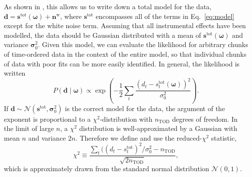 \documentclass[twocolumn]{../../common/aa}
\begin{document}
As shown in \citet{bp01}, this allows us to write down a total model for the data, $\boldsymbol d=\boldsymbol s^\mathrm{tot}(\boldsymbol\omega)+\boldsymbol n^\mathrm w$, where $\boldsymbol s^\mathrm{tot}$ encompasses all of the terms in Eq.~\eqref{eq:model} except for the white noise term. Assuming that all instrumental effects have been modelled, the data should be Gaussian distributed with a mean of $\boldsymbol s^\mathrm{tot}(\boldsymbol\omega)$ and variance $\boldsymbol \sigma_0^2$. Given this model, we can evaluate the likelihood for arbitrary chunks of time-ordered data in the context of the entire model, so that individual chunks of data with poor fits can be more easily identified. In general, the likelihood is written
\begin{equation}
	P(\boldsymbol d\mid\boldsymbol\omega)\propto\exp\left(-\frac12\sum_t\frac{(d_t-s^\mathrm{tot}_t(\boldsymbol\omega))^2}{\sigma_0^2}
	\right).
\end{equation}
If $\boldsymbol d\sim\mathcal N(\boldsymbol s^\mathrm{tot},\boldsymbol\sigma_0^2)$ is the correct model for the data, the argument of the exponent is proportional to a $\chi^2$-distribution with $n_\mathrm{TOD}$ degrees of freedom. In the limit of large $n$, a $\chi^2$ distribution is well-approximated by a Gaussian with mean $n$ and variance $2n$. Therefore we define and use the reduced-$\chi^2$ statistic,
\begin{equation}
	\chi^2\equiv \frac{\sum_t((d_t-s_t^\mathrm{tot})^2/\sigma_0^2 - n_\mathrm{TOD}}{\sqrt{2n_\mathrm{TOD}}},
\end{equation}
which is approximately drawn from the standard normal distribution $\mathcal N(0,1)$.
\end{document}
